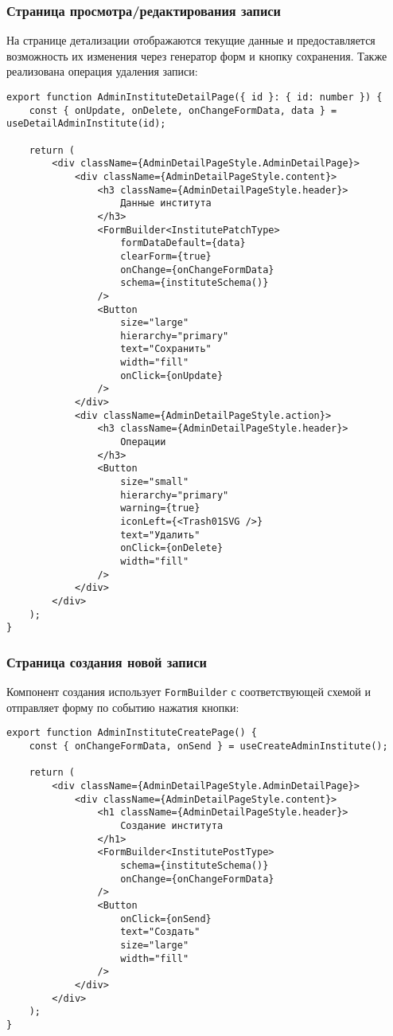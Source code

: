 \subsubsection{Страница просмотра/редактирования записи}
На странице детализации отображаются текущие данные и предоставляется возможность их изменения через генератор форм и кнопку сохранения. Также реализована операция удаления записи:
\begin{lstlisting}[caption={Компонент страницы детализации института}]
export function AdminInstituteDetailPage({ id }: { id: number }) {
    const { onUpdate, onDelete, onChangeFormData, data } = useDetailAdminInstitute(id);

    return (
        <div className={AdminDetailPageStyle.AdminDetailPage}>
            <div className={AdminDetailPageStyle.content}>
                <h3 className={AdminDetailPageStyle.header}>
                   	Данные института
                </h3>
                <FormBuilder<InstitutePatchType>
                    formDataDefault={data}
                    clearForm={true}
                    onChange={onChangeFormData}
                    schema={instituteSchema()}
                />
                <Button
                    size="large"
                    hierarchy="primary"
                    text="Сохранить"
                    width="fill"
                    onClick={onUpdate}
                />
            </div>
            <div className={AdminDetailPageStyle.action}>
                <h3 className={AdminDetailPageStyle.header}>
                   	Операции
                </h3>
                <Button
                    size="small"
                    hierarchy="primary"
                    warning={true}
                    iconLeft={<Trash01SVG />}
                    text="Удалить"
                    onClick={onDelete}
                    width="fill"
                />
            </div>
        </div>
    );
}
\end{lstlisting}

\subsubsection{Страница создания новой записи}
Компонент создания использует \texttt{FormBuilder} с соответствующей схемой и отправляет форму по событию нажатия кнопки:
\begin{lstlisting}[caption={Компонент страницы создания института}]
export function AdminInstituteCreatePage() {
    const { onChangeFormData, onSend } = useCreateAdminInstitute();

    return (
        <div className={AdminDetailPageStyle.AdminDetailPage}>
            <div className={AdminDetailPageStyle.content}>
                <h1 className={AdminDetailPageStyle.header}>
                   	Создание института
                </h1>
                <FormBuilder<InstitutePostType>
                    schema={instituteSchema()}
                    onChange={onChangeFormData}
                />
                <Button
                    onClick={onSend}
                    text="Создать"
                    size="large"
                    width="fill"
                />
            </div>
        </div>
    );
}
\end{lstlisting}

